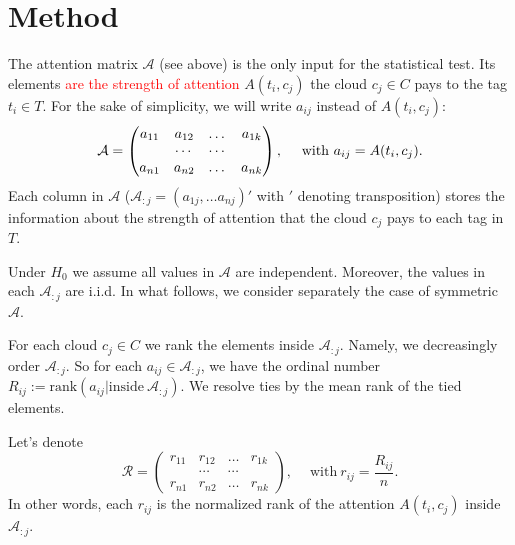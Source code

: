 \documentclass{llncs}
\begin{document}



%
\section{Method}
The attention matrix $\mathcal{A}$ (see above) is the only input for the statistical test. Its elements \textcolor{red}{are the strength of attention} $A(t_i, c_j)$ the cloud $c_j \in C$
 pays to the tag $t_i \in T$. For the sake of simplicity, we will write $a_{ij}$ instead of $A(t_i, c_j)$:
\[
\mathcal{A} = \begin{pmatrix}
a_{11} & a_{12} & \dots & a_{1k} \\
       &\cdots & \cdots &  \\
a_{n1} & a_{n2} & \dots & a_{nk}
\end{pmatrix}, 
\quad ~\text{with}~a_{ij} = A(t_i, c_j).
\]
Each column in $\mathcal{A}$ ($\mathcal{A}_{:j} =(a_{1j}, \dots a_{nj})'$ with $'$ denoting transposition)  stores the information about the strength of attention that the cloud $c_j$ pays to each tag in $T$. 

Under $H_0$ we assume all values in $\mathcal{A}$ are independent. Moreover, the values in each
$\mathcal{A}_{:j}$ are i.i.d.
In what follows, we consider separately the case of symmetric $\mathcal{A}$.

For each cloud $c_j \in C$ we rank the elements inside
$\mathcal{A}_{:j}$.
Namely, we decreasingly order $\mathcal{A}_{:j}$. So for each $a_{ij} \in \mathcal{A}_{:j}$, we have the ordinal number $R_{ij}:=\text{rank}\left(a_{ij}|\text{inside}~\mathcal{A}_{:j}\right)$. We resolve ties by the mean rank of the tied elements. 

Let's denote
\[
\mathcal{R} = \begin{pmatrix}
r_{11} & r_{12} & \dots & r_{1k} \\
       &\cdots & \cdots &  \\
r_{n1} & r_{n2} & \dots & r_{nk}
\end{pmatrix}, 
\quad ~\text{with}~r_{ij} = \frac{R_{ij}}{n}.
\]
In other words, each $r_{ij}$ is the normalized rank of the attention $A(t_i, c_j)$ inside $\mathcal{A}_{:j}$. 
\end{document}
